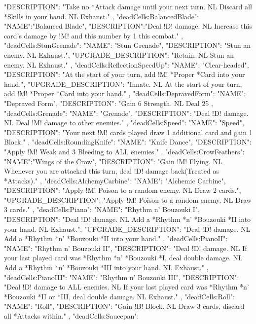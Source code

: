 {{    "DESCRIPTION": "Take no *Attack damage until your next turn. NL Discard all *Skills in your hand. NL Exhaust."
  },
  "deadCells:BalancedBlade": {
    "NAME":"Balanced Blade",
    "DESCRIPTION":"Deal !D! damage. NL Increase this card's damage by !M! and this number by 1 this combat."
  },
  "deadCells:StunGrenade": {
    "NAME": "Stun Grenade",
    "DESCRIPTION": "Stun an enemy. NL Exhaust.",
    "UPGRADE_DESCRIPTION": "Retain. NL Stun an enemy. NL Exhaust."
  },
  "deadCells:ReflectionSpeedUp": {
    "NAME": "Clear-headed",
    "DESCRIPTION": "At the start of your turn, add !M! *Proper *Card into your hand.",
    "UPGRADE_DESCRIPTION": "Innate. NL At the start of your turn, add !M! *Proper *Card into your hand."
  },
  "deadCells:DepravedForm": {
    "NAME": "Depraved Form",
    "DESCRIPTION": "Gain 6 Strength. NL Deal 25%
  },
  "deadCells:Grenade": {
    "NAME": "Grenade",
    "DESCRIPTION": "Deal !D! damage. NL Deal !M! damage to other enemies."
  },
  "deadCells:Speed": {
    "NAME": "Speed",
    "DESCRIPTION": "Your next !M! cards played draw 1 additional card and gain 1 Block."
  },
  "deadCells:RoundingKnife": {
    "NAME": "Knife Dance",
    "DESCRIPTION": "Apply !M! Weak and 3 Bleeding to ALL enemies."
  },
  "deadCells:CrowFeathers": {
    "NAME":"Wings of the Crow",
    "DESCRIPTION": "Gain !M! Flying. NL Whenever you are attacked this turn, deal !D! damage back(Treated as *Attacks)."
  },
  "deadCells:AlchemyCarbine": {
    "NAME": "Alchemic Carbine",
    "DESCRIPTION": "Apply !M! Poison to a random enemy. NL Draw 2 cards.",
    "UPGRADE_DESCRIPTION": "Apply !M! Poison to a random enemy. NL Draw 3 cards."
  },
  "deadCells:Piano": {
    "NAME": "Rhythm n' Bouzouki I",
    "DESCRIPTION": "Deal !D! damage. NL Add a *Rhythm *n' *Bouzouki *II into your hand. NL Exhaust.",
    "UPGRADE_DESCRIPTION": "Deal !D! damage. NL Add a *Rhythm *n' *Bouzouki *II into your hand."
  },
  "deadCells:PianoII": {
    "NAME": "Rhythm n' Bouzouki II",
    "DESCRIPTION": "Deal !D! damage. NL If your last played card was *Rhythm *n' *Bouzouki *I, deal double damage. NL Add a *Rhythm *n' *Bouzouki *III into your hand. NL Exhaust."
  },
  "deadCells:PianoIII": {
    "NAME": "Rhythm n' Bouzouki III",
    "DESCRIPTION": "Deal !D! damage to ALL enemies. NL If your last played card was *Rhythm *n' *Bouzouki *II or *III, deal double damage. NL Exhaust."
  },
  "deadCells:Roll": {
    "NAME": "Roll",
    "DESCRIPTION": "Gain !B! Block. NL Draw 3 cards, discard all *Attacks within."
  },
  "deadCells:Saucepan": {
}}
